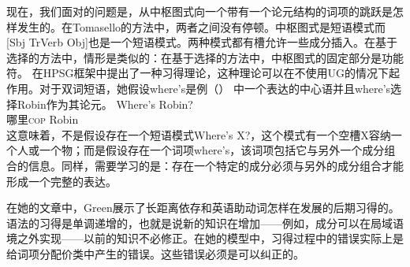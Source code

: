 现在，我们面对的问题是，从中枢图式向一个带有一个论元结构的词项的跳跃是怎样发生的。在Tomasello的方法中，两者之间没有停顿。中枢图式是短语模式而[Sbj TrVerb Obj]也是一个短语模式。两种模式都有槽允许一些成分插入。在基于选择的方法中，情形是类似的：在基于选择的方法中，中枢图式的固定部分是功能符。 \citet{Green-Grammar-Growth}在HPSG框架中提出了一种习得理论，这种理论可以在不使用UG的情况下起作用。对于双词短语，她假设where’s是例（） 中一个表达的中心语并且where’s选择Robin作为其论元。
\ea
\gll Where's Robin?\\
    哪里\textsc{cop} Robin\\
\z
这意味着，不是假设存在一个短语模式Where’s X?，这个模式有一个空槽X容纳一个人或一个物；而是假设存在一个词项where’s，该词项包括它与另外一个成分组合的信息。同样，需要学习的是：存在一个特定的成分必须与另外的成分组合才能形成一个完整的表达。

在她的文章中，Green展示了长距离依存和英语助动词怎样在发展的后期习得的。语法的习得是单调递增的，也就是说新的知识在增加——例如，成分可以在局域语境之外实现——以前的知识不必修正。在她的模型中，习得过程中的错误实际上是给词项分配价类中产生的错误。这些错误必须是可以纠正的。

